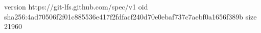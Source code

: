 version https://git-lfs.github.com/spec/v1
oid sha256:4ad70506f2f01c885536e417f2fdfacf240d70e0ebaf737c7aebf0a1656f389b
size 21960
